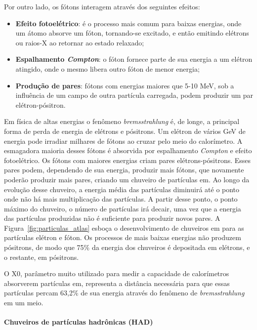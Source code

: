 Por outro lado, os fótons interagem através dos seguintes efeitos:

\begin{itemize}
\item \textbf{Efeito fotoelétrico}: é o processo mais comum para baixas
energias, onde um átomo absorve um fóton, tornando-se excitado, e então emitindo
elétrons ou raios-X ao retornar ao estado relaxado;
\item \textbf{Espalhamento \emph{Compton}}: o fóton fornece parte de sua energia
a um elétron atingido, onde o mesmo libera outro fóton de menor energia;
\item \textbf{Produção de pares}: fótons com energias maiores que 5-10 MeV, 
sob a influência de um campo de outra partícula carregada,
podem produzir um par elétron-pósitron.
\end{itemize}

Em física de altas energias o fenômeno \emph{bremsstrahlung} é, de longe, a
principal forma de perda de energia de elétrons e pósitrons. Um elétron
de vários GeV de energia pode irradiar milhares de fótons ao cruzar pelo meio do
calorímetro. A esmagadora maioria desses fótons é absorvida por espalhamento
\emph{Compton} e efeito fotoelétrico. Os fótons com maiores energias
criam pares elétrons-pósitrons. Esses pares podem, dependendo de sua energia, 
produzir mais fótons, que novamente poderão produzir mais pares,
criando um chuveiro de partículas \gls{em}. Ao longo da evolução desse
chuveiro, a energia média das partículas diminuirá até o ponto onde não há mais
multiplicação das partículas. A partir desse ponto, o ponto máximo do chuveiro,
o número de partículas irá decair, uma vez que a energia das partículas
produzidas não é suficiente para produzir novos pares. A
Figura~\ref{fig:particulas_atlas} esboça o desenvolvimento de chuveiros \gls{em} 
para as partículas elétron e fóton. Os processos de mais
baixas energias não produzem pósitrons, de modo que 75\% da energia dos
chuveiros é depositada em elétrons, e o restante, em pósitrons.

O \gls{X0}, parâmetro muito utilizado para medir a capacidade de calorímetros
absorverem partículas \gls{em}, representa a distância necessária para que 
essas partículas percam 63,2\% de sua energia através do fenômeno de
\emph{bremsstrahlung} em um meio.

\paragraph{Chuveiros de partículas hadrônicas (HAD)}
\label{par:chuveiro_had}

